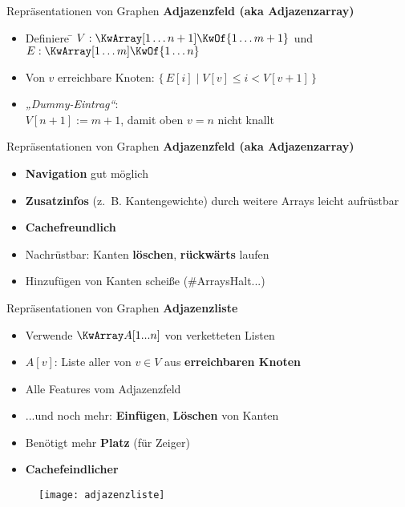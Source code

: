 \begin{frame}{Repräsentationen von Graphen}
	\textbf{Adjazenzfeld (aka Adjazenzarray)} 
	\begin{itemize}
		\item 
		\begin{tabbing}
			Definiere \= $V : \KwArray[1 \dots n+1] \KwOf \{1 \dots m+1\}$ und \\
			\> $E : \KwArray[1 \dots m] \KwOf \{1 \dots n\}$
		\end{tabbing}
		\pause
		\item Von $v$ erreichbare Knoten: $\big\lbrace\, E[i] \mid V[v] \leq i < V[v+1] \, \big\rbrace$
		\pause
		\item \emph{„Dummy-Eintrag“}: \\
		$V[n+1] := m+1$, damit oben $v = n$ nicht knallt
	\end{itemize}
\end{frame}
	
\begin{frame}{Repräsentationen von Graphen}
	\textbf{Adjazenzfeld (aka Adjazenzarray)} 
	\begin{itemize}
		\item[\Pros] \textbf{Navigation} gut möglich
		\pause
		\item[\Pros] \textbf{Zusatzinfos} (z.~B. Kantengewichte) durch weitere Arrays leicht aufrüstbar
		\pause
		\item[\Pros] \textbf{Cachefreundlich}
		\pause
		\item[\Pros] Nachrüstbar: Kanten \textbf{löschen}, \textbf{rückwärts} laufen 
	\end{itemize}
	\begin{itemize}
		\pause
		\item[\Cons] Hinzufügen von Kanten scheiße \quad (\#ArraysHalt...)
	\end{itemize}
\end{frame}

\begin{frame}{Repräsentationen von Graphen}
	\textbf{Adjazenzliste} 
	\begin{itemize}
		\item Verwende $\KwArray A[1...n]$ von verketteten Listen
		\pause
		\item $A[v]$: Liste aller von $v \in V$ aus \textbf{erreichbaren Knoten} \\
		\forcenewline
		\pause
		\item[\Pros] Alle Features vom Adjazenzfeld
		\pause
		\item[\Pros] ...und noch mehr: \textbf{Einfügen}, \textbf{Löschen} von Kanten 
		\pause
		\item[\Cons] Benötigt mehr \textbf{Platz} (für Zeiger)
		\pause
		\item[\Cons] \textbf{Cachefeindlicher}
	\end{itemize}
	\begin{figure}[htp]
		\centering
		\texttt{[image: adjazenzliste]}
	\end{figure}
\end{frame}


